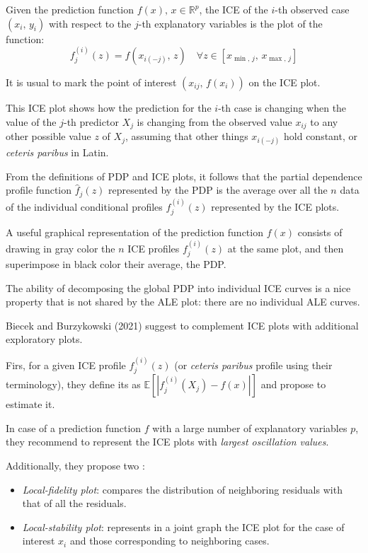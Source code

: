 Given the prediction function $f(x),\,x \in \mathbb R^p$, the ICE of the $i$-th
observed case $(x_i,\,y_i)$ with respect to the $j$-th explanatory variables
is the plot of the function:
\begin{equation*}
    f_j^{(i)}(z) = f(x_{i(-j)},\,z) \quad \forall z \in [x_{\min,\,j},\,x_{\max,\,j}]
\end{equation*}

It is usual to mark the point of interest $(x_{ij},\,f(x_i))$ on the ICE plot.

\begin{note}
    This ICE plot shows how the prediction for the $i$-th case
    is changing when the value of the $j$-th predictor $X_j$ is changing
    from the observed value $x_{ij}$ to any other possible value
    $z$ of $X_j$, assuming that other things $x_{i(-j)}$ hold constant,
    or \emph{ceteris paribus} in Latin.
\end{note}

From the definitions of PDP and ICE plots, it follows that the 
partial dependence profile function $\hat f_j(z)$ represented by the PDP
is the average over all the $n$ data of the individual conditional profiles
$f_j^{(i)}(z)$ represented by the ICE plots.

A useful graphical representation of the prediction function $f(x)$
consists of drawing in gray color the $n$ ICE profiles $f_j^{(i)}(z)$
at the same plot, and then superimpose in black color their average,
the PDP.

The ability of decomposing the global PDP into individual ICE curves
is a nice property that is not shared by the ALE plot:
there are no individual ALE curves. %

Biecek and Burzykowski (2021) %
suggest to complement ICE plots with additional exploratory plots.

Firs, for a given ICE profile $f_j^{(i)}(z)$ (or \emph{ceteris paribus} profile using their terminology),
they define its  as $\mathds E \left[ \left| f_j^{(i)}(X_j) - f(x) \right|\right]$
and propose to estimate it.

In case of a prediction function $f$ with a large number of explanatory variables $p$,
they recommend to represent the ICE plots with \emph{largest oscillation values}.

Additionally, they propose two :
\begin{itemize}
    \item \emph{Local-fidelity plot}: compares the distribution of neighboring
        residuals with that of all the residuals.
    \item \emph{Local-stability plot}: represents in a joint graph the ICE plot
        for the case of interest $x_i$ and those corresponding to neighboring cases.
\end{itemize}

